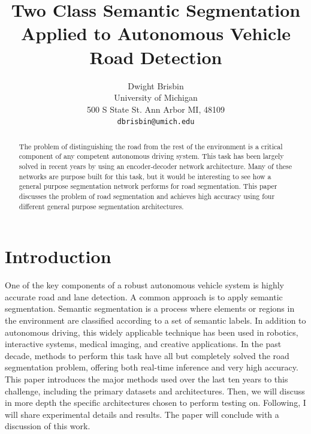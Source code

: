 \documentclass[10pt,twocolumn,letterpaper]{article}
\begin{document}
\title{Two Class Semantic Segmentation Applied to Autonomous Vehicle Road Detection}

\author{Dwight Brisbin\\
University of Michigan\\
500 S State St. Ann Arbor MI, 48109\\
{\tt\small dbrisbin@umich.edu}
}

\maketitle

\begin{abstract}
   The problem of distinguishing the road from the rest of the environment is a critical component of any competent autonomous driving system. This task has been largely solved in recent years by using an encoder-decoder network architecture. Many of these networks are purpose built for this task, but it would be interesting to see how a general purpose segmentation network performs for road segmentation. This paper discusses the problem of road segmentation and achieves high accuracy using four different general purpose segmentation architectures.
\end{abstract}

\section{Introduction}
One of the key components of a robust autonomous vehicle system is highly accurate road and lane detection. A common approach is to apply semantic segmentation. Semantic segmentation is a process where elements or regions in the environment are classified according to a set of semantic labels. In addition to autonomous driving, this widely applicable technique has been used in robotics, interactive systems, medical imaging, and creative applications. In the past decade, methods to perform this task have all but completely solved the road segmentation problem, offering both real-time inference and very high accuracy. This paper introduces the major methods used over the last ten years to this challenge, including the primary datasets and architectures. Then, we will discuss in more depth the specific architectures chosen to perform testing on. Following, I will share experimental details and results. The paper will conclude with a discussion of this work. 
\end{document}
